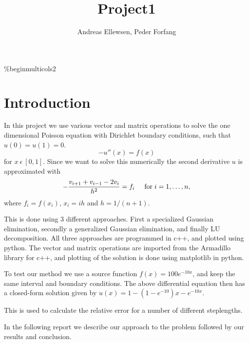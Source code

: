 \documentclass[a4paper,12pt]{article}
\title{Project1}
\author{Andreas Ellewsen, Peder Forfang}
\begin{document}
\maketitle
\tableofcontents
\newpage
\%begin{multicols}{2}
\section{Introduction}
In this project we use various vector and matrix operations to solve the one dimensional Poisson equation with Dirichlet boundary conditions, such that $u(0) = u(1) = 0$.
\[
-u''(x) = f(x)
\]
for $ x ~\epsilon ~[0,1]$.
Since we want to solve this numerically the second derivative $u$ is approximated with
\[
   -\frac{v_{i+1}+v_{i-1}-2v_i}{h^2} = f_i  \hspace{0.5cm} \mathrm{for} \hspace{0.1cm} i=1,\dots, n,
\]
where $f_i=f(x_i)$, $x_i = ih$ and $h = 1/(n+1)$.

This is done using 3 different approaches. First a specialized Gaussian elimination, secondly a generalized Gaussian elimination, and finally LU decomposition. All three approaches are programmed in c++, and plotted using python.
The vector and matrix operations are imported from the Armadillo library for c++, and plotting of the solution is done using matplotlib in python.

To test our method we use a source function $f(x) = 100e^{-10x}$, and keep the same interval and boundary 
conditions. The above differential equation then has a closed-form  solution given by $u(x) = 1-(1-e^{-10})x-e^{-10x}$.

This is used to calculate the relative error for a number of different steplengths.

In the following report we describe our approach to the problem followed by our results and conclusion.
\end{document}
